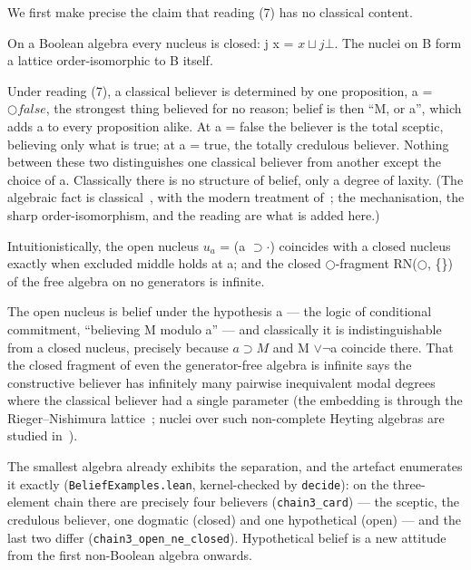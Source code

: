 We first make precise the claim that reading (7) has no classical
content.

\begin{theorem}\label{thm:collapse}
On a
Boolean algebra every nucleus is closed: j x = \ensuremath{x \sqcup j \bot}. The nuclei on B
form a lattice order-isomorphic to B itself.
\end{theorem}

Under reading (7), a classical believer is determined by one proposition,
a = \ensuremath{\bigcirc\mathit{false}}, the strongest thing believed for no reason; belief is then
``M, or a'', which adds a to every proposition alike. At
a = false the believer is the total sceptic, believing only what is
true; at a = true, the totally credulous believer. Nothing between these two
distinguishes one classical believer from another except the choice of
a. Classically there is no structure of belief, only a
degree of laxity. (The algebraic fact is
classical~\cite{BeazerMacnab1979,Macnab1981}, with the modern treatment
of~\cite{AvilaBezhanishviliMorandiZaldivar2020}; the mechanisation, the
sharp order-isomorphism, and the reading are what is added here.)

\begin{theorem}\label{thm:openclosed}
Intuitionistically, the open nucleus \ensuremath{u_{a}} = (a \ensuremath{\supset \cdot}) coincides with a
closed nucleus exactly when excluded middle holds at a; and the closed
\ensuremath{\bigcirc}-fragment RN(\ensuremath{\bigcirc}, \{\}) of the free algebra on no generators is infinite.
\end{theorem}

The open nucleus is belief under the hypothesis a --- the logic
of conditional commitment, ``believing M modulo a'' --- and classically it is
indistinguishable from a closed nucleus, precisely because \ensuremath{a \supset M} and M \ensuremath{\vee \lnot}a coincide there. That the
closed fragment of even the generator-free algebra is infinite says the
constructive believer has infinitely many pairwise inequivalent modal
degrees where the classical believer had a single parameter (the
embedding is through the Rieger--Nishimura
lattice~\cite{Rieger1949,Nishimura1960}; nuclei over such
non-complete Heyting algebras are studied
in~\cite{Erne2022,ErnePicadoPultr2022}).

The smallest algebra already exhibits the separation, and the artefact
enumerates it exactly (\texttt{BeliefExamples.lean}, kernel-checked by
\texttt{decide}): on the three-element chain there are precisely four
believers (\texttt{chain3\_card}) --- the sceptic, the credulous believer, one
dogmatic (closed) and one hypothetical (open) --- and the last two
differ (\texttt{chain3\_open\_ne\_closed}). Hypothetical belief is a new
attitude from the first non-Boolean algebra onwards.

